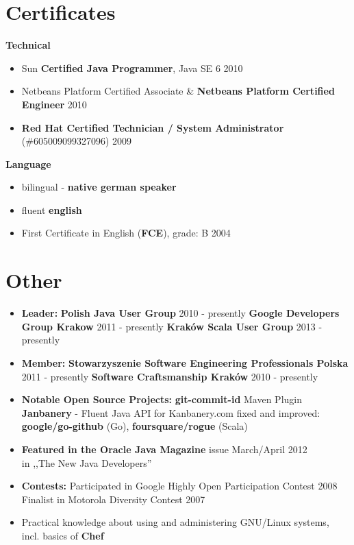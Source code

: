 \documentclass{res}
\begin{document}
\begin{resume}
\section{Certificates} 
{\bf Technical}
\begin{itemize}
 \item Sun \textbf{Certified Java Programmer}, Java SE 6 \hfill 2010
 \item Netbeans Platform Certified Associate \& \textbf{Netbeans Platform Certified Engineer} \hfill 2010
 \item \textbf{Red Hat Certified Technician / System
Administrator} (\#605009099327096) \hfill 2009\\
\end{itemize}
{\bf Language}
\begin{itemize}
 \item bilingual - \textbf{native german speaker}
 \item fluent \textbf{english}
 \item First Certificate in English (\textbf{FCE}), grade: B \hfill 2004
\end{itemize}

\section{Other} 
\begin{itemize}
 \item \textbf{Leader:}
 \subitem \textbf{Polish Java User Group} \hfill 2010 - presently 
 \subitem \textbf{Google Developers Group Krakow} \hfill 2011 - presently
 \subitem \textbf{Kraków Scala User Group} \hfill 2013 - presently
 \item \textbf{Member:}
 \subitem \textbf{Stowarzyszenie Software Engineering Professionals Polska} \hfill 2011 - presently
 \subitem \textbf{Software Craftsmanship Kraków} \hfill 2010 - presently
 \item \textbf{Notable Open Source Projects:}
 \subitem \textbf{git-commit-id} Maven Plugin
 \subitem \textbf{Janbanery} - Fluent Java API for Kanbanery.com
 \subitem fixed and improved: \textbf{google/go-github} (Go), \textbf{foursquare/rogue} (Scala)
 \item \textbf{Featured in the Oracle Java Magazine} issue March/April 2012 \\ in ,,The New Java Developers'' 
 \item \textbf{Contests:}
 \subitem Participated in Google Highly Open Participation Contest \hfill 2008
 \subitem Finalist in Motorola Diversity Contest \hfill 2007
 \item Practical knowledge about using and administering GNU/Linux systems, \\ 
       incl. basics of \textbf{Chef}
\end{itemize}


\end{resume}
\end{document}
